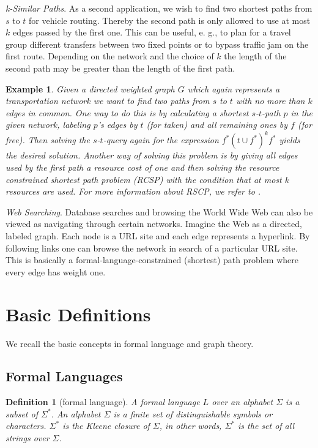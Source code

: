 \documentclass[]{article}
\newtheorem{definition}[theorem]{Definition}
\newtheorem{example}[theorem]{Example}
\numberwithin{equation}{section}
\begin{document}
\noindent \textit{k-Similar Paths}. As a second application, we wish to find two shortest paths from $s$ to $t$ for vehicle routing. Thereby the second path is only allowed to use at most $k$ edges passed by the first one. This can be useful, e. g., to plan for a travel group different transfers between two fixed points or to bypass traffic jam on the first route. Depending on the network and the choice of $k$ the length of the second path may be greater than the length of the first path.

\begin{example}
	\label{ex:kpath}
	Given a directed weighted graph $G$ which again represents a transportation network we want to find two paths from $s$ to $t$ with no more than $k$ edges in common. One way to do this is by calculating a shortest $s$-$t$-path $p$ in the given network, labeling $p$’s edges by $t$ (for taken) and all remaining ones by $f$ (for free). Then solving the $s$-$t$-query again for the expression $f^*(t \cup f^*)^kf^*$ yields the desired solution. Another way of solving this problem is by giving all edges used by the first path a resource cost of one and then solving the resource constrained shortest path problem (RCSP) with the condition that at most $k$ resources are used. For more information about RSCP, we refer to \cite{ID05}.
\end{example}

\noindent \textit{Web Searching}. Database searches and browsing the World Wide Web can also be viewed as navigating through certain networks. Imagine the Web as a directed, labeled graph. Each node is a URL site and each edge represents a hyperlink. By following links one can browse the network in search of a particular URL site. This is basically a formal-language-constrained (shortest) path problem where every edge has weight one.

\newpage

\section{Basic Definitions}
\label{sec:def}

We recall the basic concepts in formal language and graph theory.

\subsection{Formal Languages}
\label{sec:def:lang}

\begin{definition}[formal language]
	\label{def:language}
	A formal language $L$ over an alphabet $\Sigma$ is a subset of $\Sigma^*$. An alphabet $\Sigma$ is a finite set of distinguishable symbols or characters. $\Sigma^*$ is the Kleene closure of $\Sigma$, in other words, $\Sigma^*$ is the set of all strings over $\Sigma$.
\end{definition}
\end{document}
